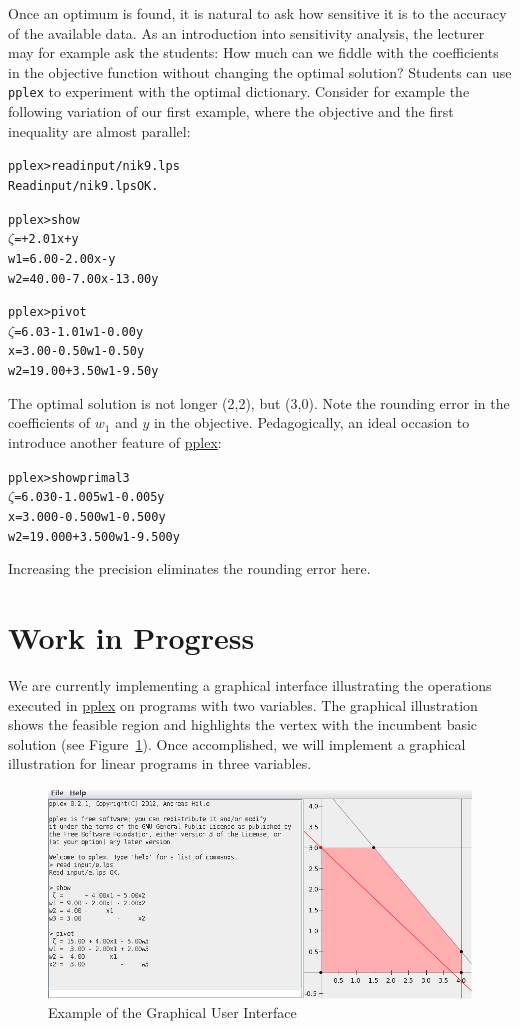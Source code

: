 \documentclass[ukenglish]{nik}
\begin{document}
Once an optimum is found, it is natural to ask how sensitive it is to the accuracy of the available data. 
As an introduction into sensitivity analysis, the lecturer may for example ask the students: 
How much can we fiddle with the coefficients in the objective function without changing the optimal solution?
Students can use \texttt{pplex} to experiment with the optimal dictionary.
Consider for example the following variation of our first example,
where the objective and the first inequality are almost parallel:
\begin{alltt}
pplex> read input/nik9.lps
Read input/nik9.lps OK.

pplex> show        
 \(\zeta\) =       + 2.01x +      y
w1 =  6.00 - 2.00x -      y
w2 = 40.00 - 7.00x - 13.00y

pplex> pivot
 \(\zeta\) =  6.03 - 1.01w1 - 0.00y
 x =  3.00 - 0.50w1 - 0.50y
w2 = 19.00 + 3.50w1 - 9.50y
\end{alltt}
The optimal solution is not longer (2,2), but (3,0). 
Note the rounding error in the coefficients of $w_1$ and $y$ in the objective.
Pedagogically, an ideal occasion to introduce another feature of \url{pplex}: 
\begin{alltt}
pplex> show primal 3
 \(\zeta\) =  6.030 - 1.005w1 - 0.005y
 x =  3.000 - 0.500w1 - 0.500y
w2 = 19.000 + 3.500w1 - 9.500y
\end{alltt}
Increasing the precision eliminates the rounding error here.

\section{Work in Progress}\label{sec:future}
We are currently implementing a graphical interface illustrating the operations executed in \url{pplex} on programs with two variables. The graphical illustration shows the feasible
region and highlights the vertex with the incumbent basic solution (see Figure~\ref{fig:ex_gui}).
Once accomplished, we will implement a graphical
illustration for linear programs in three variables.

\begin{figure}[h!]
	\begin{center}
		\includegraphics[width=\textwidth]{ex_gui.jpg}
	\end{center}
	\caption{Example of the Graphical User Interface}
	\label{fig:ex_gui}
\end{figure}
\end{document}
